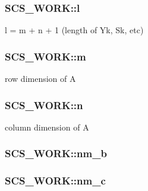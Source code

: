 \hypertarget{struct_s_c_s___w_o_r_k_a597806c444b40c7af22a76f3324b220f}{
\subsubsection[{l}]{ S\-C\-S\-\_\-\-W\-O\-R\-K\-::l}}\label{struct_s_c_s___w_o_r_k_a597806c444b40c7af22a76f3324b220f}
l = m + n + 1 (length of Yk, Sk, etc) \hypertarget{struct_s_c_s___w_o_r_k_a789378d94292c785137f4e251424caa6}{
\subsubsection[{m}]{ S\-C\-S\-\_\-\-W\-O\-R\-K\-::m}}\label{struct_s_c_s___w_o_r_k_a789378d94292c785137f4e251424caa6}
row dimension of A \hypertarget{struct_s_c_s___w_o_r_k_a3c52343d851d6f6d3607e1ac2ce970a4}{
\subsubsection[{n}]{ S\-C\-S\-\_\-\-W\-O\-R\-K\-::n}}\label{struct_s_c_s___w_o_r_k_a3c52343d851d6f6d3607e1ac2ce970a4}
column dimension of A \hypertarget{struct_s_c_s___w_o_r_k_a5b686305d7024feb40904274357356ed}{
\subsubsection[{nm\-\_\-b}]{ S\-C\-S\-\_\-\-W\-O\-R\-K\-::nm\-\_\-b}}\label{struct_s_c_s___w_o_r_k_a5b686305d7024feb40904274357356ed}
\hypertarget{struct_s_c_s___w_o_r_k_a0f44fdacf4fb826f04c19cadf678fc03}{
\subsubsection[{nm\-\_\-c}]{ S\-C\-S\-\_\-\-W\-O\-R\-K\-::nm\-\_\-c}}\label{struct_s_c_s___w_o_r_k_a0f44fdacf4fb826f04c19cadf678fc03}
